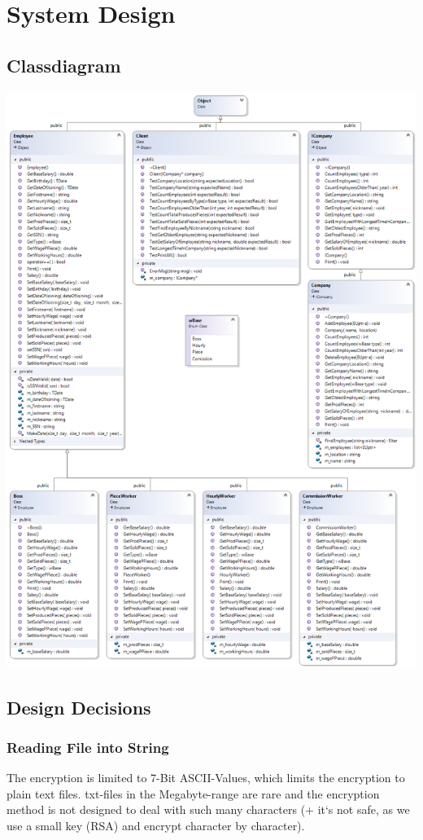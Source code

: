 \section{System Design}
\subsection{Classdiagram}
\includegraphics[scale=0.6]{ClassDiagram}

\subsection{Design Decisions}
\subsubsection{Reading File into String}
The encryption is limited to 7-Bit ASCII-Values, which limits the encryption to plain text files. txt-files in the Megabyte-range are rare and the encryption method is not designed to deal with such many characters (+ it`s not safe, as we use a small key (RSA) and encrypt character by character).
